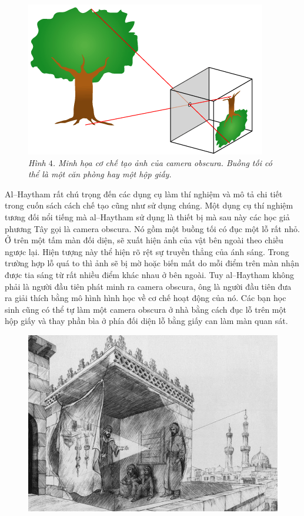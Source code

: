 \begin{multicols}{2}
\begin{figure}[H]
		\includegraphics[width= 1\linewidth]{5}
		\caption{\small\textit{\color{lichsutoanhoc}Hình $4$. Minh họa cơ chế tạo ảnh của camera obscura. Buồng tối có thể là một căn phòng hay một hộp giấy.}}
		\vspace*{-5pt}
	\end{figure}
	Al--Haytham rất chú trọng đến các dụng cụ làm thí nghiệm và mô tả chi tiết trong cuốn sách cách chế tạo cũng như sử dụng chúng. Một dụng cụ thí nghiệm tương đối nổi tiếng mà al--Haytham sử dụng là thiết bị mà sau này các học giả phương Tây gọi là camera obscura. Nó gồm một buồng tối có đục một lỗ rất nhỏ. Ở trên một tấm màn đối diện, sẽ xuất hiện ảnh của vật bên ngoài theo chiều ngược lại. Hiện tượng này thể hiện rõ rệt sự truyền thẳng của ánh sáng. Trong trường hợp lỗ quá to thì ảnh sẽ bị mờ hoặc biến mất do mỗi điểm trên màn nhận được tia sáng từ rất nhiều điểm khác nhau ở bên ngoài. Tuy al--Haytham không phải là người đầu tiên phát minh ra camera obscura, ông là người đầu tiên đưa ra giải thích bằng mô hình hình học về cơ chế hoạt động của nó. Các bạn học sinh cũng có thể tự làm một camera obscura ở nhà bằng cách đục lỗ trên một hộp giấy và thay phần bìa ở phía đối diện lỗ bằng giấy can làm màn quan sát.
	\begin{figure}[H]
		\vspace*{-5pt}
		\centering
		\captionsetup{labelformat= empty, justification=centering}
		\includegraphics[width= 1\linewidth]{6}

\end{figure}
\end{multicols}
